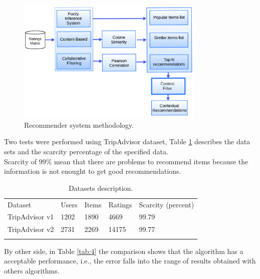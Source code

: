 \begin{figure}
\captionsetup{font=footnotesize}
\centering
\includegraphics[width=0.80\textwidth]{img/archit-ta.png}
\caption{Recommender system methodology.}
\label{fig:architecture}   
\end{figure}
Two tests were performed using TripAdvisor dataset, 
Table  \ref{tab:3} describes the data sets and the scarcity percentage of the
specified data. \\ Scarcity of 99\% mean that there are problems to
recommend items because the information is not enought to get 
good recommendations.
\begin{table}
\centering
\small
\captionsetup{font=footnotesize}
\caption{Datasets description.}
\label{tab:3}      
\begin{tabular}{lllll}
\hline\noalign{\smallskip}
Dataset & Users & Items & Ratings & Scarcity (percent) \\
\noalign{\smallskip}\hline\noalign{\smallskip}
TripAdvisor v1 & 1202 & 1890 & 4669 & 99.79 \\
TripAdvisor v2 & 2731 & 2269 & 14175 & 99.77 \\
\noalign{\smallskip}\hline
\end{tabular}
\end{table}
By other side, in Table  \ref{tab:4} the comparison
shows that the algorithm has a acceptable performance, i.e., the error
falls into the range of results obtained with others algorithms. 

